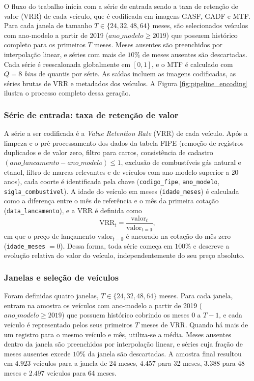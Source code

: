 O fluxo do trabalho inicia com a série de entrada sendo a taxa de retenção de valor (VRR) de cada veículo, que é codificada em imagens GASF, GADF e MTF. Para cada janela de tamanho $T \in \{24, 32, 48, 64\}$ meses, são selecionados veículos com ano-modelo a partir de 2019 ($\textit{ano\_modelo} \ge 2019$) que possuem histórico completo para os primeiros $T$ meses. Meses ausentes são preenchidos por interpolação linear, e séries com mais de $10\%$ de meses ausentes são descartadas. Cada série é reescalonada globalmente em $[0,1]$, e o MTF é calculado com $Q=8$ \textit{bins} de quantis por série. As saídas incluem as imagens codificadas, as séries brutas de VRR e metadados dos veículos. A Figura \ref{fig:pipeline_encoding} ilustra o processo completo dessa geração.



\subsubsection{Série de entrada: taxa de retenção de valor}

A série a ser codificada é a \textit{Value Retention Rate} (VRR) de cada veículo. Após a limpeza e o pré-processamento dos dados da tabela FIPE (remoção de registros duplicados e de valor zero, filtro para carros, consistência de cadastro $(\textit{ano\_lancamento} - \textit{ano\_modelo}) \le 1$, exclusão de combustíveis gás natural e etanol, filtro de marcas relevantes e de veículos com ano-modelo superior a 20 anos), cada coorte é identificada pela chave (\texttt{codigo\_fipe}, \texttt{ano\_modelo}, \texttt{sigla\_combustivel}). A idade do veículo em meses (\texttt{idade\_meses}) é calculada como a diferença entre o mês de referência e o mês da primeira cotação (\texttt{data\_lancamento}), e a VRR é definida como
\begin{equation}
\mathrm{VRR}_t = \frac{\text{valor}_t}{\text{valor}_{t=0}},
\end{equation}
em que o preço de lançamento $\text{valor}_{t=0}$ é ancorado na cotação do mês zero (\texttt{idade\_meses} $=0$). Dessa forma, toda série começa em $100\%$ e descreve a evolução relativa do valor do veículo, independentemente do seu preço absoluto.

\subsubsection{Janelas e seleção de veículos}

Foram definidas quatro janelas, $T \in \{24, 32, 48, 64\}$ meses. Para cada janela, entram na amostra os veículos com ano-modelo a partir de 2019 ($\textit{ano\_modelo} \ge 2019$) que possuem histórico cobrindo os meses $0$ a $T-1$, e cada veículo é representado pelos seus primeiros $T$ meses de VRR. Quando há mais de um registro para o mesmo veículo e mês, utiliza-se a média. Meses ausentes dentro da janela são preenchidos por interpolação linear, e séries cuja fração de meses ausentes excede $10\%$ da janela são descartadas. A amostra final resultou em $4.923$ veículos para a janela de 24 meses, $4.457$ para 32 meses, $3.388$ para 48 meses e $2.497$ veículos para 64 meses.

